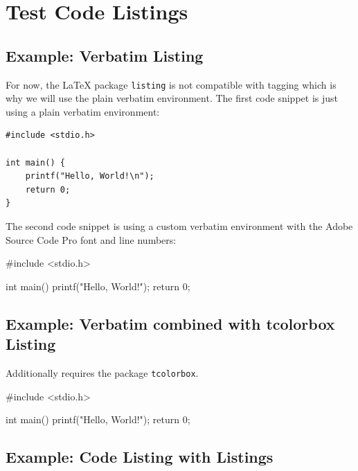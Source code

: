 
\chapter{Test Code Listings} \label{chap:codelistings}

\section{Example: Verbatim Listing} \label{sec:verbatimlistings}

For now, the \LaTeX\/ package \texttt{listing} is not compatible with tagging which is why we will use the plain verbatim environment.
The first code snippet is just using a plain verbatim environment:

\begin{verbatim}
#include <stdio.h>

int main() {
    printf("Hello, World!\n");
    return 0;
}
\end{verbatim}

The second code snippet is using a custom verbatim environment with the Adobe Source Code Pro font and line numbers:

\begin{coding}
#include <stdio.h>

int main() {
    printf("Hello, World!\n");
    return 0;
}
\end{coding}



\section{Example: Verbatim combined with tcolorbox Listing} \label{sec:tcolorboxlistings}

Additionally requires the package \texttt{tcolorbox}.

\begin{tcolorbox}[colback=gray!25, boxsep=0pt, arc=0pt, boxrule=0pt]
\begin{coding}
#include <stdio.h>

int main() {
    printf("Hello, World!\n");
    return 0;
}
\end{coding}
\end{tcolorbox}

\section{Example: Code Listing with Listings}

